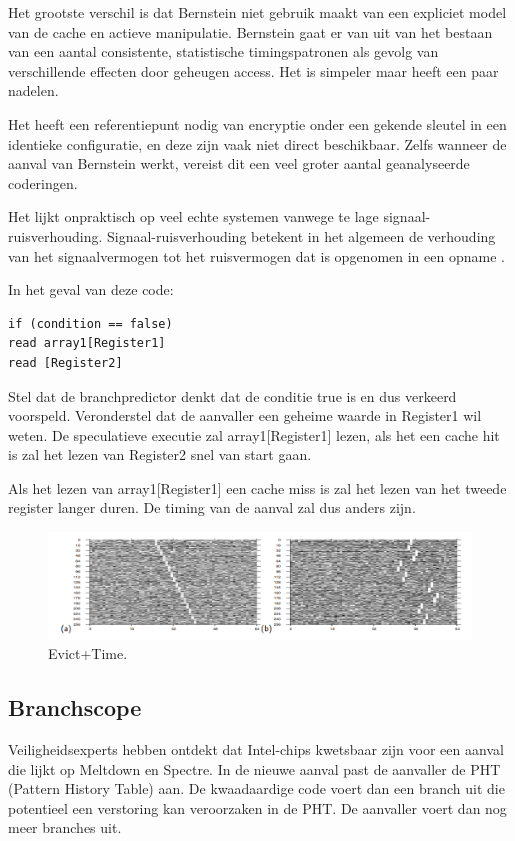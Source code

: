 Het grootste verschil is dat Bernstein \parencite{Bernstein2005} niet gebruik maakt van 
een expliciet model van de cache en actieve manipulatie. Bernstein gaat er van uit van het bestaan van
een aantal consistente, statistische timingspatronen als gevolg van verschillende effecten door geheugen access.
Het is simpeler maar heeft een paar nadelen.

Het heeft een referentiepunt nodig van encryptie onder een gekende sleutel in een identieke configuratie, en deze zijn vaak niet direct beschikbaar.
Zelfs wanneer de aanval van Bernstein \parencite{Bernstein2005} werkt, vereist dit
een veel groter aantal geanalyseerde coderingen.

Het lijkt onpraktisch op veel echte systemen vanwege te lage signaal-ruisverhouding.
Signaal-ruisverhouding betekent in het algemeen de verhouding van het signaalvermogen tot het ruisvermogen dat is opgenomen in een opname \parencite{Johnson2006}.

In het geval van deze code:
\begin{lstlisting}
if (condition == false)
read array1[Register1]
read [Register2]
\end{lstlisting}
Stel dat de branchpredictor denkt dat de conditie true is en dus verkeerd voorspeld.
Veronderstel dat de aanvaller een geheime waarde in Register1 wil weten.
De speculatieve executie zal array1[Register1] lezen, als het een cache hit is zal het lezen van Register2 snel van start gaan.


Als het lezen van array1[Register1] een cache miss is zal het lezen van het tweede register langer duren.
De timing van de aanval zal dus anders zijn.

\begin{figure}
	\includegraphics[width=1.0\linewidth]{img/evicttime.png}
	\caption{Evict+Time.}
	\label{fig:evicttime}
\end{figure}


\subsection{Branchscope}
Veiligheidsexperts hebben ontdekt dat Intel-chips kwetsbaar zijn voor een aanval die lijkt op Meltdown en Spectre.
In de nieuwe aanval past de aanvaller de PHT (Pattern History Table) aan.
De kwaadaardige code voert dan een branch uit die potentieel een verstoring kan veroorzaken in de PHT.
De aanvaller voert dan nog meer branches uit.

